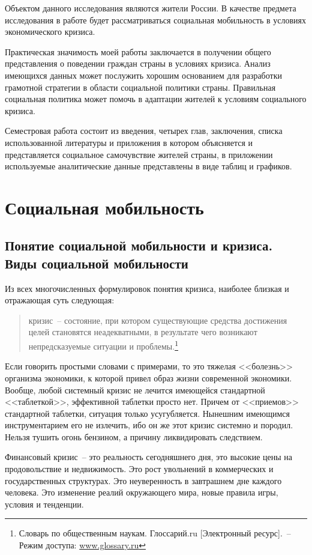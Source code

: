  Объектом данного исследования являются жители России. В качестве предмета
  исследования в работе будет рассматриваться социальная мобильность в условиях
  экономического кризиса.

  Практическая значимость моей работы заключается в получении общего
  представления о поведении граждан страны в условиях кризиса. Анализ имеющихся
  данных может послужить хорошим основанием для разработки грамотной стратегии
  в области социальной политики страны. Правильная социальная политика может
  помочь в адаптации жителей к условиям социального кризиса.

  Семестровая работа состоит из введения, четырех глав, заключения, списка
  использованной литературы и приложения в котором объясняется и представляется
  социальное самочувствие жителей страны, в приложении используемые
  аналитические данные представлены в виде таблиц и графиков.

  \section{Социальная мобильность}
  \subsection{Понятие социальной мобильности и кризиса. Виды социальной
    мобильности}

  Из всех многочисленных формулировок понятия кризиса, наиболее близкая и
  отражающая суть следующая:
  \begin{quote}
    кризис~-- состояние, при котором существующие средства достижения целей
    становятся неадекватными, в результате чего возникают непредсказуемые
    ситуации и проблемы.\footnote{Словарь по общественным наукам.
    Глоссарий.ru [Электронный ресурс].~-- Режим доступа: \url{www.glossary.ru}}
  \end{quote}
  Если говорить простыми словами с примерами, то это тяжелая <<болезнь>>
  организма экономики, к которой привел образ жизни современной экономики.
  Вообще, любой системный кризис не лечится имеющейся стандартной <<таблеткой>>,
  эффективной таблетки просто нет. Причем от <<приемов>> стандартной таблетки,
  ситуация только усугубляется. Нынешним имеющимся инструментарием
  его не излечить, ибо он же этот кризис системно и породил. Нельзя тушить
  огонь бензином, а причину ликвидировать следствием.

  Финансовый кризис~-- это реальность сегодняшнего дня, это высокие цены на
  продовольствие и недвижимость. Это рост увольнений в коммерческих и
  государственных структурах. Это неуверенность в завтрашнем дне каждого
  человека. Это изменение реалий окружающего мира, новые правила игры, условия
  и тенденции.

